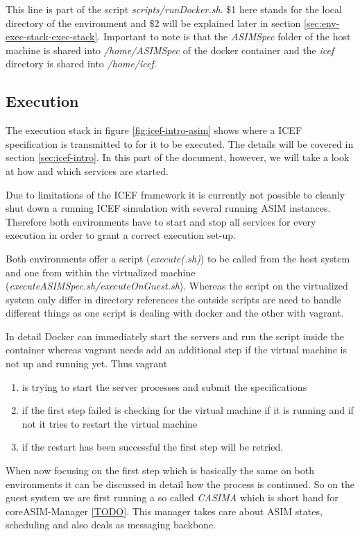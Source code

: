 This line is part of the script \textit{scripts/runDocker.sh}. \$1 here stands for the local directory of the environment and \$2 will be explained later in section \ref{sec:env-exec-stack-exec-stack}. Important to note is that the \textit{ASIMSpec} folder of the host machine is shared into \textit{/home/ASIMSpec} of the docker container and the \textit{icef} directory is shared into \textit{/home/icef}.

\subsection{Execution}
\label{sec:env-exec-stack-exe}

The execution stack in figure \ref{fig:icef-intro-asim} shows where a ICEF specification is transmitted to for it to be executed. The details will be covered in section \ref{sec:icef-intro}. In this part of the document, however, we will take a look at how and which services are started.

Due to limitations of the ICEF framework it is currently not possible to cleanly shut down a running ICEF simulation with several running ASIM instances. Therefore both environments have to start and stop all services for every execution in order to grant a correct execution set-up.

Both environments offer a script (\textit{execute(.sh)}) to be called from the host system and one from within the virtualized machine (\textit{executeASIMSpec.sh/executeOnGuest.sh}). Whereas the script on the virtualized system only differ in directory references the outside scripts are need to handle different things as one script is dealing with docker and the other with vagrant.

In detail Docker can immediately start the servers and run the script inside the container whereas vagrant needs add an additional step if the virtual machine is not up and running yet. Thus vagrant

\begin{enumerate}
	\item is trying to start the server processes and submit the specifications
	\item if the first step failed is checking for the virtual machine if it is running and if not it tries to restart the virtual machine
	\item if the restart has been successful the first step will be retried.
\end{enumerate}

When now focusing on the first step which is basically the same on both environments it can be discussed in detail how the process is continued. So on the guest system we are first running a so called \textit{CASIMA} which is short hand for coreASIM-Manager \ref{TODO}. This manager takes care about ASIM states, scheduling and also deals as messaging backbone.


